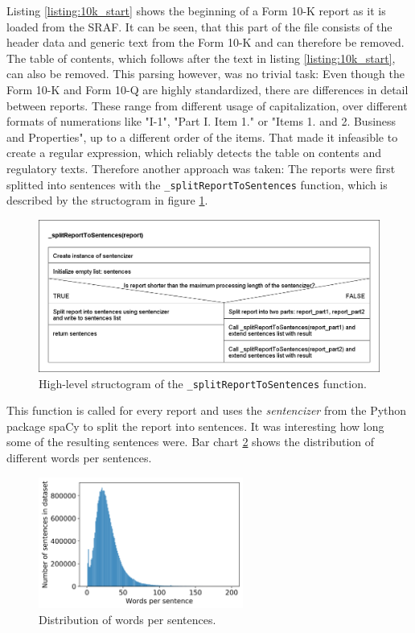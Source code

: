 \FloatBarrier

Listing \ref{listing:10k_start} shows the beginning of a Form 10-K report as it is loaded from the \ac{SRAF}.
It can be seen, that this part of the file consists of the header data and generic text from the Form 10-K and can therefore be removed.
The table of contents, which follows after the text in listing \ref{listing:10k_start}, can also be removed.
This parsing however, was no trivial task:
Even though the Form 10-K and Form 10-Q are highly standardized, there are differences in detail between reports.
These range from different usage of capitalization, over different formats of numerations like "I-1", "Part I. Item 1." or "Items 1. and 2. Business and Properties", up to a different order of the items.
That made it infeasible to create a regular expression, which reliably detects the table on contents and regulatory texts.
Therefore another approach was taken: The reports were first splitted into sentences with the \texttt{\_splitReportToSentences} function, which is described by the structogram in figure \ref{figure:structogram_splitReportToSentences}.
\begin{figure}[h]
    \centering
    \includegraphics[width=1\textwidth]{figures/structogram_splitReportToSentences.png}
    \caption{High-level structogram of the \texttt{\_splitReportToSentences} function.}
    \label{figure:structogram_splitReportToSentences}
\end{figure}
This function is called for every report and uses the \textit{sentencizer} from the Python package spaCy to split the report into sentences.
It was interesting how long some of the resulting sentences were.
Bar chart \ref{figure:words_distribution} shows the distribution of different words per sentences.
\begin{figure}[h]
    \centering
    \includegraphics[width=0.6\textwidth]{figures/charts/words_distribution.png}
    \caption{Distribution of words per sentences.}
    \label{figure:words_distribution}
\end{figure}
